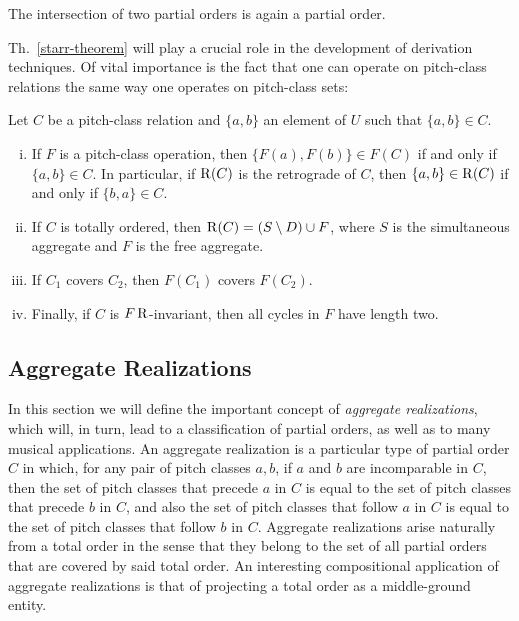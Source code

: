\begin{theorem}
    \cite[194]{Starr1984}
    The intersection of two partial orders is again a partial order.
\end{theorem}

Th.~\ref{starr-theorem} will play a crucial role in the development of derivation techniques. Of vital importance is the fact that one can operate on pitch-class relations the same way one operates on pitch-class sets:

\begin{theorem}
    \cite[195]{Starr1984}
    Let $C$ be a pitch-class relation and $\{ a, b \}$ an element of $U$ such that $\{ a, b \} \in C$.
    \begin{enumerate}[i.]
        \item If $F$ is a pitch-class operation, then $\{ F(a), F(b) \} \in F(C)$ if and only if $\{ a, b \} \in C$. In particular, if $\operatorname{R}(C)$ is the retrograde of $C$, then $\{ a, b \} \in \operatorname{R}(C)$ if and only if $\{ b, a \} \in C$.
        \item If $C$ is totally ordered, then $\operatorname{R}(C) = (S \setminus D) \cup F$, where $S$ is the simultaneous aggregate and $F$ is the free aggregate.
        \item If $C_1$ covers $C_2$, then $F(C_1)$ covers $F(C_2)$.
        \item Finally, if $C$ is $F\operatorname{R}$-invariant, then all cycles in $F$ have length two.
    \end{enumerate}
\end{theorem}

\subsection{Aggregate Realizations}

In this section we will define the important concept of \emph{aggregate realizations}, which will, in turn, lead to a classification of partial orders, as well as to many musical applications. An aggregate realization is a particular type of partial order $C$ in which, for any pair of pitch classes $a, b$, if $a$ and $b$ are incomparable in $C$, then the set of pitch classes that precede $a$ in $C$ is equal to the set of pitch classes that precede $b$ in $C$, and also the set of pitch classes that follow $a$ in $C$ is equal to the set of pitch classes that follow $b$ in $C$. Aggregate realizations arise naturally from a total order in the sense that they belong to the set of all partial orders that are covered by said total order. An interesting compositional application of aggregate realizations is that of projecting a total order as a middle-ground entity.

